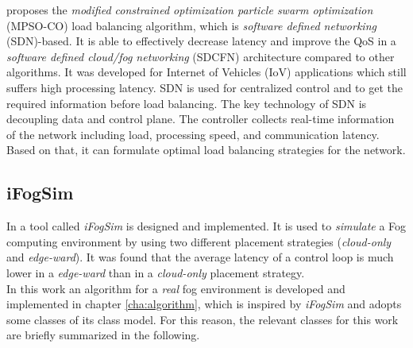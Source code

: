 \cite{novel-load-balancing} proposes the \textit{modified constrained optimization particle swarm optimization} (MPSO-CO) load balancing algorithm, which is \textit{software defined networking} (SDN)-based.
It is able to effectively decrease latency and improve the QoS in a \textit{software defined cloud/fog networking} (SDCFN) architecture compared to other algorithms.
It was developed for Internet of Vehicles (IoV) applications which still suffers high processing latency.
SDN is used for centralized control and to get the required information before load balancing.
The key technology of SDN is decoupling data and control plane.
The controller collects real-time information of the network including load, processing speed, and communication latency.
Based on that, it can formulate optimal load balancing strategies for the network.

\subsection*{iFogSim}

In \cite{ifogsim} a tool called \textit{iFogSim} is designed and implemented. It is used to \textit{simulate} a Fog computing environment by using two different placement strategies (\textit{cloud-only} and \textit{edge-ward}). It was found that the average latency of a control loop is much lower in a \textit{edge-ward} than in a \textit{cloud-only} placement strategy.\\

In this work an algorithm for a \textit{real} fog environment is developed and implemented in chapter \ref{cha:algorithm}, which is inspired by \textit{iFogSim} and adopts some classes of its class model. For this reason, the relevant classes for this work are briefly summarized in the following.\\

